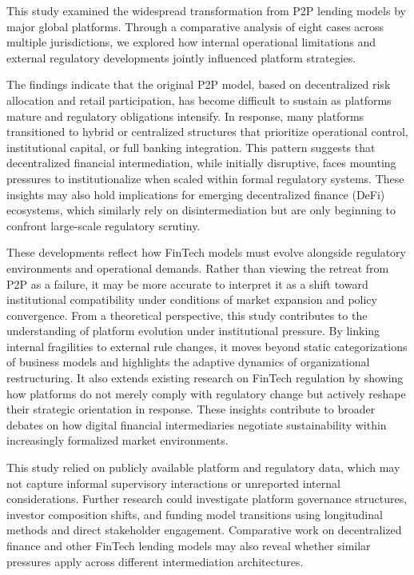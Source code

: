 \documentclass[pdflatex,sn-apa]{sn-jnl}%
\theoremstyle{thmstyleone}%
\theoremstyle{thmstyletwo}%
\theoremstyle{thmstylethree}%
\begin{document}
This study examined the widespread transformation from P2P lending models by major global platforms. Through a comparative analysis of eight cases across multiple jurisdictions, we explored how internal operational limitations and external regulatory developments jointly influenced platform strategies.

The findings indicate that the original P2P model, based on decentralized risk allocation and retail participation, has become difficult to sustain as platforms mature and regulatory obligations intensify. In response, many platforms transitioned to hybrid or centralized structures that prioritize operational control, institutional capital, or full banking integration. \textcolor{NavyBlue}{This pattern suggests that decentralized financial intermediation, while initially disruptive, faces mounting pressures to institutionalize when scaled within formal regulatory systems. These insights may also hold implications for emerging decentralized finance (DeFi) ecosystems, which similarly rely on disintermediation but are only beginning to confront large-scale regulatory scrutiny.}

These developments reflect how FinTech models must evolve alongside regulatory environments and operational demands. Rather than viewing the retreat from P2P as a failure, it may be more accurate to interpret it as a shift toward institutional compatibility under conditions of market expansion and policy convergence. \textcolor{NavyBlue}{From a theoretical perspective, this study contributes to the understanding of platform evolution under institutional pressure. By linking internal fragilities to external rule changes, it moves beyond static categorizations of business models and highlights the adaptive dynamics of organizational restructuring. It also extends existing research on FinTech regulation by showing how platforms do not merely comply with regulatory change but actively reshape their strategic orientation in response. These insights contribute to broader debates on how digital financial intermediaries negotiate sustainability within increasingly formalized market environments.}

This study relied on publicly available platform and regulatory data, which may not capture informal supervisory interactions or unreported internal considerations. Further research could investigate platform governance structures, investor composition shifts, and funding model transitions using longitudinal methods and direct stakeholder engagement. Comparative work on decentralized finance and other FinTech lending models may also reveal whether similar pressures apply across different intermediation architectures. 
\end{document}
